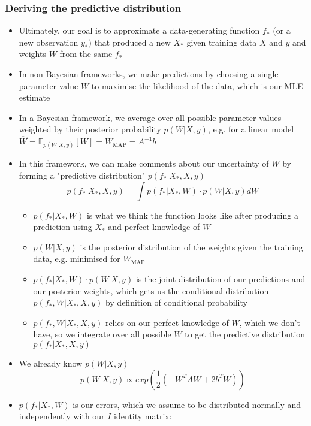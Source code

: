 \documentclass[12pt]{article}
\begin{document}
\subsubsection{Deriving the predictive distribution}
\begin{itemize}
    \item Ultimately, our goal is to approximate a data-generating function $f_*$ (or a new observation $y_*$) that produced a new $X_*$ given training data $X$ and $y$ and weights $W$ from the same $f_*$  
    \item In non-Bayesian frameworks, we make predictions by choosing a single parameter value $W$ to maximise the likelihood of the data, which is our MLE estimate
    \item In a Bayesian framework, we average over all possible parameter values weighted by their posterior probability $p(W|X,y)$, e.g. for a linear model $\hat{W} = \mathbb{E}_{p(W|X,y)}[W] = W_\text{MAP} = A^{-1}b$
    \item In this framework, we can make comments about our uncertainty of $W$ by forming a "predictive distribution" $p(f_*|X_*,X,y)$
\begin{equation}
    p(f_*|X_*,X,y) = \int p(f_*|X_*,W) \cdot p(W | X,y)dW
\end{equation}
    \begin{itemize}
        \item $p(f_*|X_*,W)$ is what we think the function looks like after producing a prediction using $X_*$ and perfect knowledge of $W$
        \item $p(W|X,y)$ is the posterior distribution of the weights given the training data, e.g. minimised for $W_\text{MAP}$
        \item $p(f_*|X_*,W) \cdot p(W|X,y)$ is the joint distribution of our predictions and our posterior weights, which gets us the conditional distribution $p(f_*,W|X_*,X,y)$ by definition of conditional probability
        \item $p(f_*,W|X_*,X,y)$ relies on our perfect knowledge of $W$, which we don't have, so we integrate over all possible $W$ to get the predictive distribution $p(f_*|X_*,X,y)$
    \end{itemize}
    \item We already know $p(W|X,y)$
\begin{equation}
    p(W|X,y) \propto exp\left(\frac{1}{2}(-W^TAW + 2b^TW)\right)
\end{equation}
    \item $p(f_*|X_*,W)$ is our errors, which we assume to be distributed normally and independently with our $I$ identity matrix:

\end{itemize}
\end{document}
